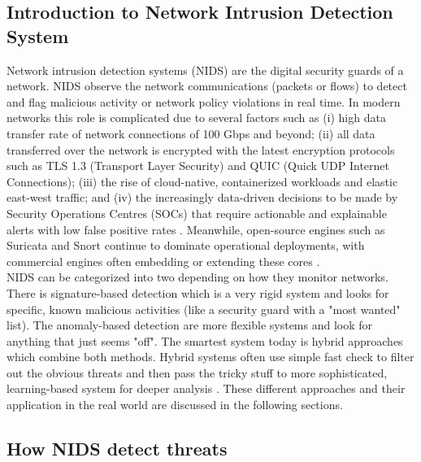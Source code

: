\subsection{Introduction to Network Intrusion Detection System}
Network intrusion detection systems (NIDS) are the digital security guards of a network. NIDS observe the network communications (packets or flows) to detect and flag malicious activity or network policy violations in real time. In modern networks this role is complicated due to several factors such as (i) high data transfer rate of network connections of 100 Gbps and beyond; (ii) all data transferred over the network is encrypted with the latest encryption protocols such as TLS 1.3 (Transport Layer Security) and QUIC (Quick UDP Internet Connections); (iii) the rise of cloud-native, containerized workloads and elastic east-west traffic; and (iv) the increasingly data-driven decisions to be made by Security Operations Centres (SOCs) that require actionable and explainable alerts with low false positive rates \parencite{Zhou2024TLS13Survey,Cerasuolo2025Adaptable,KBS2025Datasets}.
 Meanwhile, open-source engines such as Suricata and Snort continue to dominate operational deployments, with commercial engines often embedding or extending these cores \parencite{SuricataDocs2025,SnortManual2024,CiscoSnort3Guide2024}.\\
 
\noindent NIDS can be categorized into two depending on how they monitor networks. There is signature-based detection which is a very rigid system and looks for specific, known malicious activities (like a security guard with a "most wanted" list). The anomaly-based detection are more flexible systems and look for anything that just seems "off". The smartest system today is hybrid approaches which combine both methods. Hybrid systems often use simple fast check to filter out the obvious threats and then pass the tricky stuff to more sophisticated, learning-based system for deeper analysis \parencite{Maseno2022HybridReview,Han2023HPNIDS,Naghib2025HybridReview}. These different approaches and their application in the real world are discussed in the following sections.

\subsection{How NIDS detect threats}
